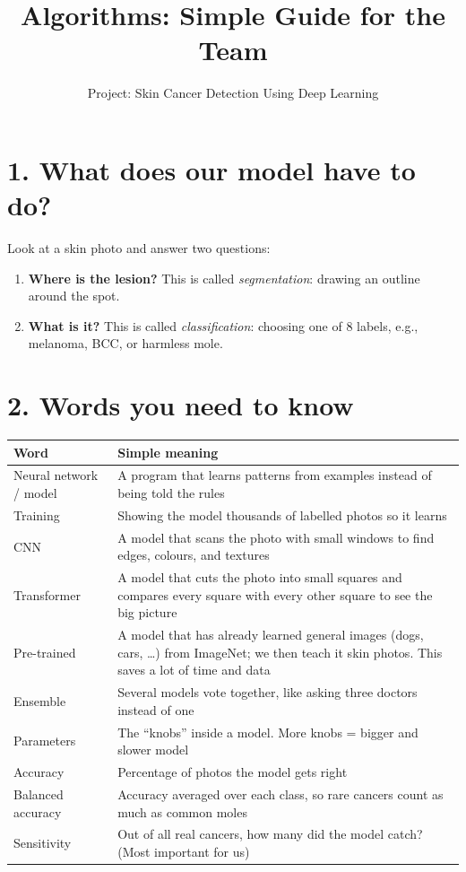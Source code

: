 \documentclass[11pt,a4paper]{article}
\title{\color{hcBlue}\bfseries Algorithms: Simple Guide for the Team}
\author{Project: Skin Cancer Detection Using Deep Learning}
\date{}
\begin{document}
\maketitle
\vspace{-8mm}

\section*{1. What does our model have to do?}
Look at a skin photo and answer two questions:
\begin{enumerate}
  \item \textbf{Where is the lesion?} This is called
        \emph{segmentation}: drawing an outline around the spot.
  \item \textbf{What is it?} This is called \emph{classification}:
        choosing one of 8 labels, e.g., melanoma, BCC, or harmless mole.
\end{enumerate}

\section*{2. Words you need to know}
\begin{tabularx}{\linewidth}{@{}L{3.8cm} Y@{}}
\toprule
\textbf{Word} & \textbf{Simple meaning} \\
\midrule
Neural network / model & A program that learns patterns from examples instead of being told the rules \\
Training & Showing the model thousands of labelled photos so it learns \\
CNN & A model that scans the photo with small windows to find edges, colours, and textures \\
Transformer & A model that cuts the photo into small squares and compares every square with every other square to see the big picture \\
Pre-trained & A model that has already learned general images (dogs, cars, \ldots) from ImageNet; we then teach it skin photos. This saves a lot of time and data \\
Ensemble & Several models vote together, like asking three doctors instead of one \\
Parameters & The ``knobs'' inside a model. More knobs = bigger and slower model \\
Accuracy & Percentage of photos the model gets right \\
Balanced accuracy & Accuracy averaged over each class, so rare cancers count as much as common moles \\
Sensitivity & Out of all real cancers, how many did the model catch? (Most important for us) \\
\bottomrule
\end{tabularx}
\end{document}
